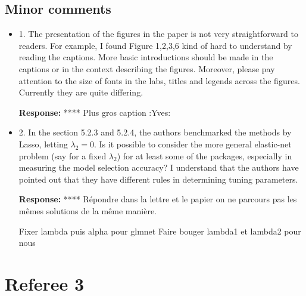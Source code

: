 \documentclass[a4paper,11pt]{texMemo}
\newenvironment{comment}
{
   \par\medskip \color{black}%
   \textbf{Response: }}
{\medskip}
\newenvironment{remark}
{\begin{itshape} \color{gray}}
{\end{itshape}}
\begin{document}
\subsection*{Minor comments}

\begin{itemize}
\item
  \begin{remark}
    1. The presentation of the figures in the paper is not very
    straightforward to readers. For example, I found Figure 1,2,3,6
    kind of hard to understand by reading the captions.  More basic
    introductions should be made in the captions or in the context
    describing the figures. Moreover, please pay attention to the size
    of fonts in the labs, titles and legends across the
    figures. Currently they are quite differing.
  \end{remark}

  \begin{comment}
**** Plus gros caption :Yves:
  \end{comment}
\item 
  \begin{remark}
    2. In the section 5.2.3 and 5.2.4, the authors benchmarked the
    methods by Lasso, letting $\lambda_2 = 0$. Is it possible to consider the
    more general elastic-net problem (say for a fixed $\lambda_2$) for at least
    some of the packages, especially in measuring the model selection
    accuracy? I understand that the authors have pointed out that they
    have different rules in determining tuning parameters.
  \end{remark}
  \begin{comment}
    **** Répondre dans la lettre et le papier on ne parcours pas les
    mêmes solutions de la même manière.

    Fixer lambda puis alpha pour glmnet Faire bouger lambda1 et
    lambda2 pour nous
  \end{comment}
\end{itemize}


\section*{Referee 3}

\end{document}
